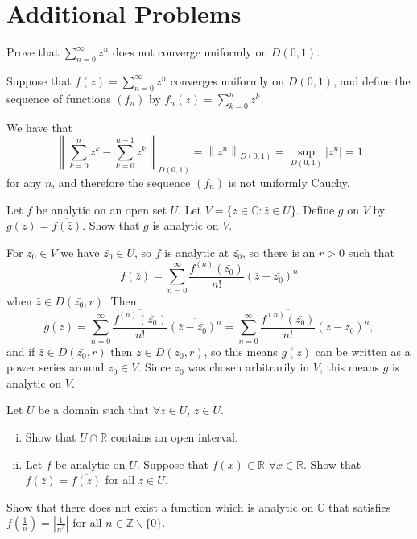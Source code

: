 \documentclass{article}
\newcounter{Problem}
\newenvironment{Problem}{\begin{Exercise}[name={Problem},
                                          counter={Problem}]}
                        {\end{Exercise}}
\begin{document}
\section{Additional Problems}

\begin{Problem}
  Prove that $\sum_{n=0}^\infty z^n$ does not converge uniformly on
  $D(0, 1)$.
\end{Problem}

\begin{Answer}
  Suppose that $f(z) = \sum_{n=0}^\infty z^n$ converges uniformly on $D(0,1)$,
  and define the sequence of functions $(f_n)$ by
  $f_n(z) = \sum_{k=0}^n z^k$. %

  We have that
  $$
  \left\|
    \sum_{k=0}^n z^k
  - \sum_{k=0}^{n-1} z^k
  \right\|_{D(0,1)}
  =
  \left\|
    z^n
  \right\|_{D(0,1)}
  =
  \sup_{D(0,1)} |z^n|
  = 1
  $$
  for any $n$, and therefore the sequence $(f_n)$ is not uniformly
  Cauchy.
\end{Answer}

\begin{Problem}
  Let $f$ be analytic on an open set $U$. Let
  $V = \{ z \in \mathbb{C} : \bar{z} \in U \}$. Define $g$ on $V$ by
  $g(z) = \overline{f(\bar{z})}$. Show that $g$ is analytic on $V$.
\end{Problem}

\begin{Answer}
For $z_0 \in V$ we have $\bar{z_0} \in U$, so
$f$ is analytic at $\bar{z_0}$, so there is an
$r > 0$ such that
$$
  f(\bar{z})
= \sum_{n=0}^\infty \frac{f^{(n)}(\bar{z_0})}{n!}(\bar{z} - \bar{z_0})^n
$$
when $\bar{z} \in D(\bar{z_0}, r)$. Then
$$
  g(z)
= \sum_{n=0}^\infty \frac{\overline{f^{(n)}(\bar{z_0})}}{n!}
                 \overline{(\bar{z} - \bar{z_0})^n}
= \sum_{n=0}^\infty \frac{\overline{f^{(n)}(\bar{z_0})}}{n!}
                  (z - z_0)^n,
$$
and if $\bar{z} \in D(\bar{z_0}, r)$ then $z \in D(z_0, r)$,
so this means $g(z)$ can be written as a power series
around $z_0 \in V$. Since $z_0$ was chosen arbitrarily
in $V$, this means $g$ is analytic on $V$.
\end{Answer}

\begin{Problem}
  Let $U$ be a domain such that $\forall z \in U$, $\bar{z} \in U$.
  \begin{enumerate}[(i)]
    \item{
      Show that $U \cap \mathbb{R}$ contains an open interval.
    }
    \item{
      Let $f$ be analytic on $U$. Suppose that $f(x) \in \mathbb{R}$
      $\forall x \in \mathbb{R}$. Show that $f(\bar{z}) = \overline{f(z)}$
      for all $z \in U$.
    }
  \end{enumerate}
\end{Problem}

\begin{Problem}
  Show that there does not exist a function which is analytic on
  $\mathbb{C}$ that satisfies
  $f\left(\frac{1}{n}\right) = \left|\frac{1}{n^3}\right|$ for all
  $n \in \mathbb{Z} \backslash \{ 0 \}$.
\end{Problem}
\end{document}
